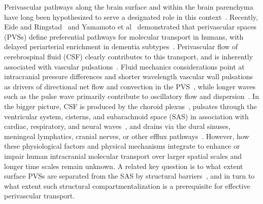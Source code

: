 \documentclass[fleqn,10pt]{wlscirep}
\begin{document}
Perivascular pathways along the brain surface and within the brain
parenchyma have long been hypothesized to serve a designated role in
this context~\cite{rennels1985evidence, zhang1990interrelationships,
  ichimura1991distribution, carare2008solutes, iliff2012paravascular,
  foley2012realtime, hannocks2018molecular, van2024caa}. Recently, Eide and
Ringstad~\cite{eide2024functional} and Yamamoto et
al~\cite{yamamoto2024perivascular} demonstrated that perivascular
spaces (PVSs) define preferential pathways for molecular transport in
humans, with delayed periarterial enrichment in dementia
subtypes~\cite{eide2024functional}. Perivascular flow of cerebrospinal
fluid (CSF) clearly contributes to this transport, and is inherently
associated with vascular pulsations~\cite{hadaczek2006perivascular,
  iliff2013cerebral, bedussi2018paravascular, mestre2018flow,
  boster2023artificial, hirschler2024region}. Fluid mechanics
considerations point at intracranial pressure differences and shorter
wavelength vascular wall pulsations as drivers of directional net flow
and convection in the PVS~\cite{bilston2003arterial, rey2018pulsatile,
  daversin2020mechanisms, kedarasetti2020functional,
  gjerde2023directional, nozaleda2024arterial}, while longer waves
such as the pulse wave primarily contribute to oscillatory flow and
dispersion~\cite{asgari2016glymphatic, sharp2019dispersion, thomas2019fluid,
  kedarasetti2020arterial, troyetsky2021dispersion, 
  martinac2021phase}. In the bigger picture, CSF is produced by the
choroid plexus~\cite{damkier2013cerebrospinal,
  steffensen2018cotransporter, liu2020direct}, pulsates through the
ventricular system, cisterns, and subarachnoid space (SAS) in
association with cardiac, respiratory, and neural
waves~\cite{greitz1993pulsatile, wagshul2011pulsating,
  sweetman2011cerebrospinal, fultz2019coupled, vinje2019respiratory,
  eide2021direction, causemann2022human, williams2023neural,
  zimmermann2023total}, and drains via the dural sinuses, meningeal
lymphatics, cranial nerves, or other efflux
pathways~\cite{proulx2021cerebrospinal}. However, how these
physiological factors and physical mechanisms integrate to enhance or
impair human intracranial molecular transport over larger spatial
scales and longer time scales remain unknown. A related key question
is to what extent surface PVSs are separated from the SAS by
structural barriers~\cite{zhang1990interrelationships,
  weller2005microscopic, bedussi2017paravascular,
  pizzo2018intrathecal, mestre2022periarteriolar,
  mollgard2023mesothelium, smets2024perivascular, eide2024functional},
and in turn to what extent such structural compartmentalization is a
prerequisite for effective perivascular transport.
 
\end{document}
